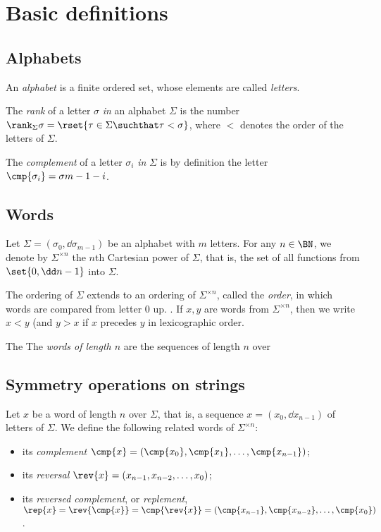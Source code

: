 \section{Basic definitions}

\newcommand{\sig}{\sigma}
\newcommand{\Sig}{\Sigma}

\subsection{Alphabets}

An {\em alphabet} is a finite ordered set, whose elements are called
{\em letters}. 

The {\em rank} of a letter $\sig$ {\em in} an alphabet $\Sig$ 
is the number $\rank_{\Sig}{\sig} = \rset{\tau \in \Sig \suchthat \tau < \sig}$,
where $<$ denotes the order of the letters of $\Sig$.

The
{\em complement} of a letter $\sig_i$ {\em in} $\Sig$ is by definition
the letter $\cmp{\sig_i} = \sig{m-1-i}$.



\subsection{Words}

Let $\Sig=(\sig_0,\dd\sig_{m-1})$ be an alphabet with $m$ letters.  
For any $n\in\BN$, we denote by $\Sig^{\times {n}}$ the $n$th
Cartesian power of $\Sig$, that is, the set of 
all functions from $\set{0,\dd n-1}$ into $\Sig$. 

The ordering of $\Sig$ extends to an ordering of
$\Sig^{\times n}$, called the {\em  order},
in which words are compared from letter 0 up.
.
If $x,y$ are words from $\Sig^{\times n}$, then we write $x<y$ (and
$y>x$ if $x$ precedes $y$ in lexicographic order.

The 
The {\em words of length $n$} are the sequences of length $n$ over 

\subsection{Symmetry operations on strings}

Let $x$ be a word of length $n$ over $\Sig$, that is, a sequence
$x=(x_0,\dd x_{n-1})$ of letters of $\Sig$.  We define the following
related words of $\Sig^{\times n}$:
\begin{itemize}
  \item[] its {\em complement} $\cmp{x}= (\cmp{x_0},\cmp{x_1},\dots, \cmp{x_{n-1}})$;
  \item[] its {\em reversal} $\rev{x}=(x_{n-1},x_{n-2},\dots, x_0)$;
  \item[] its {\em reversed complement}, or {\em replement},
    $\rep{x}= \rev{\cmp{x}} = \cmp{\rev{x}} = 
      (\cmp{x_{n-1}}, \cmp{x_{n-2}}, \dots, \cmp{x_0})$.
\end{itemize}

